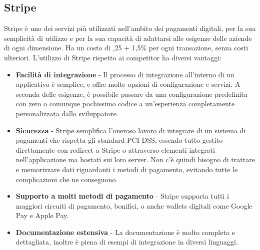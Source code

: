 \subsection{Stripe}
Stripe \`e uno dei servizi pi\`u utilizzati nell'ambito dei pagamenti digitali, per la sua semplicit\`a di utilizzo e per la sua capacit\`a di adattarsi alle esigenze delle aziende
di ogni dimensione. Ha un costo di ,25 + 1,5\% per ogni transazione, senza costi ulteriori.
L'utilizzo di Stripe rispetto ai competitor ha diversi vantaggi:
\begin{itemize}
  \item \textbf{Facilit\`a di integrazione} - Il processo di integrazione all'interno di un applicativo \`e semplice, e offre molte opzioni di configurazione e servizi.
    A seconda delle esigenze, \`e possibile passare da una configurazione predefinita con zero o comunque pochissimo codice a un'esperienza completamente personalizzata dallo sviluppatore.
  \item \textbf{Sicurezza} - Stripe semplifica l'oneroso lavoro di integrare di un sistema di pagamenti che rispetta gli standard PCI DSS, essendo tutto gestito
    direttamente con redirect a Stripe o attraverso elementi integrati nell'applicazione ma hostati sui loro server. Non c'\`e quindi bisogno di trattare e memorizzare dati
    riguardanti i metodi di pagamento, evitando tutte le complicazioni che ne conseguono.
  \item \textbf{Supporto a molti metodi di pagamento} - Stripe supporta tutti i maggiori circuiti di pagamento, bonifici, o anche wallets digitali come Google Pay e Apple Pay.
  \item \textbf{Documentazione estensiva} - La documentazione \`e molto completa e dettagliata, inoltre \`e piena di esempi di integrazione in diversi linguaggi.
\end{itemize}
